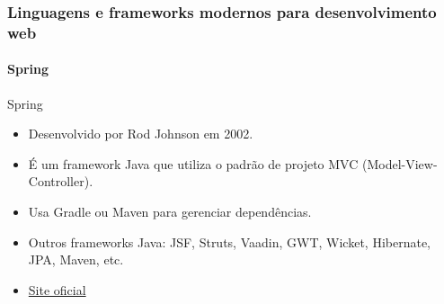 \documentclass[
	9pt, %
	t, %
]{beamer}
\newcommand{\iconLink}[2]{\href{#1}{\faLink \hspace{0.2em} {#2}}}
\begin{document}
\begin{frame}
	\frametitle{Linguagens e frameworks modernos para desenvolvimento web}
	\framesubtitle{Spring}

	\begin{block}{Spring}
		\begin{itemize}
			\item Desenvolvido por Rod Johnson em 2002. 
			\item É um framework Java que utiliza o padrão de projeto MVC (Model-View-Controller).
			\item Usa Gradle ou Maven para gerenciar dependências.
			\item Outros frameworks Java: JSF, Struts, Vaadin, GWT, Wicket, Hibernate, JPA, Maven, etc.
			\item \iconLink{https://spring.io/}{Site oficial}
		\end{itemize}
	\end{block}

\end{frame}
	
		
\end{document}
